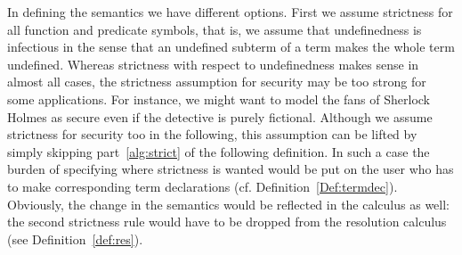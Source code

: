\documentclass{\filespath jancl}
\begin{document}
In defining the semantics we have different options. First we assume
strictness for all function and predicate symbols, that is, we assume
that undefinedness is infectious in the sense that an undefined
subterm of a term makes the whole term undefined.  Whereas strictness
with respect to undefinedness makes sense in almost all cases, the
strictness assumption for security may be too strong for some
applications. For instance, we might want to model the fans of
Sherlock Holmes as secure even if the detective is purely fictional.
Although we assume strictness for security too in the following, this
assumption can be lifted by simply skipping part~\ref{alg:strict} of
the following definition.  In such a case the burden of specifying
where strictness is wanted would be put on the user who has to make
corresponding term declarations (cf.
Definition~\ref{Def:termdec}). Obviously, the change in the semantics
would be reflected in the calculus as well: the second strictness rule
would have to be dropped from the resolution calculus (see
Definition~\ref{def:res}).
\end{document}
